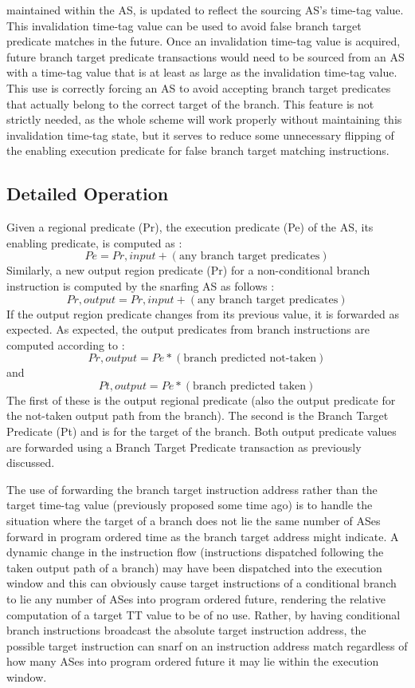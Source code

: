 \documentclass[10pt,dvips]{article}
\begin{document}
maintained within the AS, is updated to reflect the
sourcing AS's time-tag value.  This invalidation time-tag
value can be used to avoid false branch target predicate matches
in the future.  Once an invalidation time-tag value is
acquired, future branch target predicate transactions would
need to be sourced from an AS with a time-tag value that is
at least as large as the invalidation time-tag value.
This use is correctly forcing an AS to avoid accepting
branch target predicates that actually belong to the correct target of
the branch.
This feature is not strictly needed, as the whole scheme will
work properly without maintaining this invalidation
time-tag state, but it serves to reduce some unnecessary flipping
of the enabling execution predicate for false 
branch target matching instructions.
%
\subsection{Detailed Operation}
%
Given a regional predicate (Pr),
the execution predicate (Pe) of the AS, its enabling predicate,
is computed as :
\[
	Pe = Pr,input + (\mbox{any branch target predicates})
\]
Similarly, a new output region predicate (Pr) 
for a non-conditional branch instruction 
is computed 
by the snarfing AS as follows :
\[
	Pr,output = Pr,input + (\mbox{any branch target predicates})
\]
If the output region predicate changes from its previous value, it is
forwarded as expected.  
As expected, the output predicates from branch instructions are
computed according to :
\[
	Pr,output = Pe * (\mbox{branch predicted not-taken})
\]
and
\[
	Pt,output = Pe * (\mbox{branch predicted taken})
\]
The first of these is the output regional predicate (also the
output predicate for the not-taken output path from the branch).
The second is the Branch Target Predicate (Pt) and is for the 
target of the branch.  Both output
predicate values are forwarded using a Branch Target Predicate
transaction as previously discussed.

The use of forwarding the branch target instruction address rather than
the target time-tag value (previously proposed some time ago) is to handle
the situation where the target of a branch does not lie the same number
of ASes forward in program ordered 
time as the branch target address might indicate.  
A dynamic change in the instruction flow (instructions dispatched following
the taken output path of a branch) may have been dispatched into the
execution window and this can obviously cause target instructions of a
conditional branch to lie any number of ASes into program ordered
future, rendering
the relative computation of a target TT value to be of no use.  Rather,
by having conditional branch instructions 
broadcast the absolute target instruction
address, the possible target instruction can snarf on an instruction
address match regardless of how many ASes into program ordered future 
it may lie
within the execution window.
\end{document}
